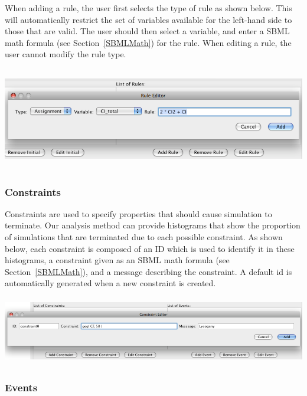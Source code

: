 \documentclass[titlepage,11pt]{article}
\begin{document}
When adding a rule, the user first selects the type of rule as shown
below.  This
will automatically restrict the set of variables available for the 
left-hand side to those that are valid.  The user should then select
a variable, and enter a SBML math formula (see Section~\ref{SBMLMath})
for the rule.  When editing a rule, the user cannot modify the rule type. 
\begin{center}
\includegraphics[height=45mm]{screenshots/rule}
\end{center}

\subsubsection{\label{constraints}Constraints}

\noindent
Constraints are used to specify properties that should cause
simulation to terminate.  Our analysis method can provide histograms 
that show the proportion of simulations that are terminated due to each
possible constraint.  As shown below, 
each constraint is composed of an ID which is
used to identify it in these histograms, a constraint given as an 
SBML math formula (see Section~\ref{SBMLMath}), and a message 
describing the constraint.  A default id is automatically generated 
when a new constraint is created.
\begin{center}
\includegraphics[height=30mm]{screenshots/constraint}
\end{center}

\subsubsection{\label{events}Events}
\end{document}
